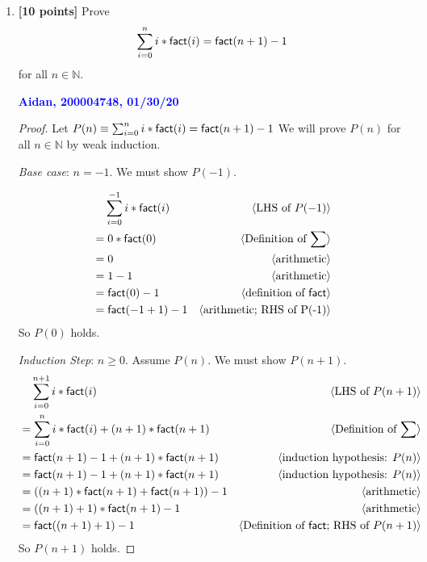 \documentclass[11pt,fleqn]{article}
\newcommand{\mname}[1]{\mbox{\sf #1}}
\newcommand{\pnote}[1]{{\langle \text{#1} \rangle}}
\begin{document}
\begin{enumerate}

  \item \textbf{[10 points]} Prove \[\sum^{n}_{i = 0} i *
    \mname{fact}(i) = \mname{fact}(n+1) - 1\] for all $n \in
    \mathbb{N}$.

  \bigskip

  \textcolor{blue}{\textbf{Aidan, 200004748, 01/30/20}}

  \begin{proof}
  Let $P(n) \equiv \sum^{n}_{i = 0} i * \mname{fact}(i) = \mname{fact}
  (n+1) - 1$ We will prove $P(n)$ for all $n \in \mathbb{N}$ by weak 
  induction.

  \medskip

  \emph{Base case}: $n = -1$. We must show $P(-1)$.

  \begin{align*}
  &\phantom{{}=} \sum^{-1}_{i=0} i * \mname{fact}(i) & \pnote{LHS of $P(-1)$}\\
  &= 0 * \mname{fact}(0) & \pnote{Definition of $\sum$}\\
  &= 0 & \pnote{arithmetic}\\
  &= 1 - 1 & \pnote{arithmetic}\\
  &= \mname{fact}(0) - 1 & \pnote{definition of \mname{fact}}\\
  &= \mname{fact}(-1 + 1) - 1 & \pnote{arithmetic; RHS of P(-1)}\\
  \end{align*}
  So $P(0)$ holds.

  \medskip

  \emph{Induction Step}: $n \ge 0$. Assume $P(n)$. We must show $P(n + 1)$.
  \begin{align*}
  &\phantom{{}=} \sum^{n+1}_{i=0} i * \mname{fact}(i) & \pnote{LHS of $P(n + 1)$}\\
  &= \sum^{n}_{i=0} i * \mname{fact}(i) + (n + 1) * \mname{fact}(n + 1)  & \pnote{Definition of $\sum$}\\
  &= \mname{fact}(n + 1) - 1 + (n + 1) * \mname{fact}(n + 1) & \pnote{induction hypothesis: $P(n)$}\\
  &= \mname{fact}(n + 1) - 1 + (n + 1) * \mname{fact}(n + 1) & \pnote{induction hypothesis: $P(n)$}\\
  &= ((n + 1) * \mname{fact}(n + 1) + \mname{fact}(n + 1)) - 1 & \pnote{arithmetic}\\
  &= ((n + 1) + 1) * \mname{fact}(n + 1) - 1 & \pnote{arithmetic}\\
  &= \mname{fact}((n + 1) + 1) - 1 & \pnote{Definition of $\mname{fact}$; RHS of $P(n+1)$}
  \end{align*}
  So $P(n + 1)$ holds.
  \end{proof}


\end{enumerate}
\end{document}

